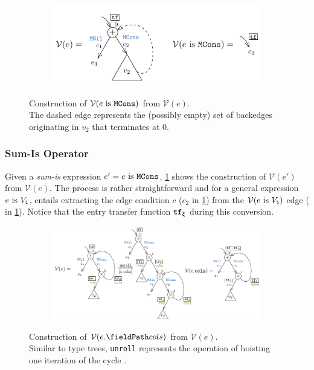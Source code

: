 \begin{figure}[H]
\begin{subfigure}[b]{\textwidth}
\begin{center}
\includegraphics[scale=1.3]{chapters/figures/figValueTreeConvSumIs.pdf}
\end{center}
\end{subfigure}
\caption{\label{fig:valuetreeconvsumis} Construction of $\mathcal{V}(e\ \mathrm{is}\ {\tt MCons})$ from $\mathcal{V}(e)$.\\
The dashed edge represents the (possibly empty) set of backedges originating in $v_2$ that terminates at 0.}
\end{figure}

\subsubsection{Sum-Is Operator}
Given a {\em sum-is} expression $e' = e\ \mathrm{is}\ {\tt MCons}$,
\cref{fig:valuetreeconvsumis} shows the construction of $\mathcal{V}(e')$
from $\mathcal{V}(e)$.
The process is rather straightforward and for a general expression $e\ \mathrm{is}\ {\tt \mathnormal{V}_i}$, entails extracting the
edge condition $c$ ($c_2$ in \cref{fig:valuetreeconvsumis}) from the $\mathcal{V}(e\ \mathrm{is}\ {\tt \mathnormal{V}_i})$ edge
 ( in \cref{fig:valuetreeconvsumis}).
Notice that the entry transfer function ${\tt tf}{}_\xi$ during this conversion.

\begin{figure}[H]
\begin{subfigure}[b]{\textwidth}
\begin{center}
\includegraphics[scale=1.2]{chapters/figures/figValueTreeConvProdAccess.pdf}
\end{center}
\end{subfigure}
\caption{\label{fig:valuetreeconvprodaccess} Construction of $\mathcal{V}(\prodAccess{e}{cols})$ from $\mathcal{V}(e)$.\\
Similar to type trees, {\tt unroll}  represents the operation of hoisting one iteration of the cycle .}
\end{figure}


